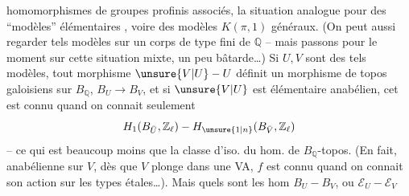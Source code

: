 homomorphismes de groupes profinis associés,   la situation analogue pour des ``modèles'' élémentaires , voire des modèles $K(\pi,1)$ généraux. (On peut aussi regarder  tels modèles sur un corps   de type fini de $\mathbb Q$ -- mais passons pour le moment sur cette situation mixte, un peu bâtarde\ldots) Si $U,V$ sont des tels modèles, tout morphisme $\unsure{V|U}-U$ définit un morphisme de topos galoisiens sur $B_{\mathbb Q}$, $B_U\longrightarrow B_V$,  et si $\unsure{V|U}$ est  élémentaire anabélien, cet  est connu quand on connait seulement
\[
H_1(B_{\bar U},\mathbb Z_{\ell})-H_{\unsure{1|n}}(B_{\bar V},\mathbb Z_{\ell})
\]
-- ce qui est beaucoup moins que la classe d'iso. du hom. de $B_{\mathbb Q}$-topos. (En fait,   anabélienne sur $V$, dès que $V$  plonge dans une VA, $f$ est connu quand on connait son action sur les types étales\ldots). Mais quels sont les hom $B_U-B_V$, ou $\mathcal E_U-\mathcal E_V$
